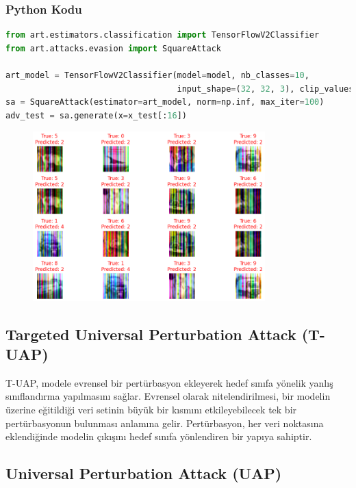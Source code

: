 \subsubsection{Python Kodu}

\begin{lstlisting}[language=Python]
from art.estimators.classification import TensorFlowV2Classifier
from art.attacks.evasion import SquareAttack

art_model = TensorFlowV2Classifier(model=model, nb_classes=10, 
                                   input_shape=(32, 32, 3), clip_values=(0, 1))
sa = SquareAttack(estimator=art_model, norm=np.inf, max_iter=100)
adv_test = sa.generate(x=x_test[:16])
\end{lstlisting}

\begin{figure}[h]
    \centering
    \includegraphics[width=0.8\textwidth]{images/square_attack_results.png}
    \caption{}
\end{figure}

\newpage

\subsection{Targeted Universal Perturbation Attack (T-UAP)}

T-UAP, modele evrensel bir pertürbasyon ekleyerek hedef sınıfa yönelik yanlış sınıflandırma yapılmasını sağlar. Evrensel olarak nitelendirilmesi, bir modelin üzerine eğitildiği veri setinin büyük bir kısmını etkileyebilecek tek bir pertürbasyonun bulunması anlamına gelir. Pertürbasyon, her veri noktasına eklendiğinde modelin çıkışını hedef sınıfa yönlendiren bir yapıya sahiptir.

\newpage

\subsection{Universal Perturbation Attack (UAP)}

